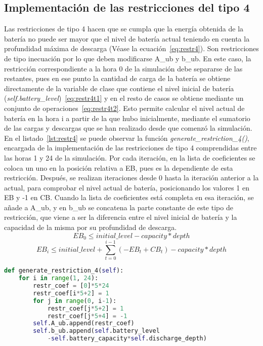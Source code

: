 \subsection{Implementación de las restricciones del tipo 4}
Las restricciones de tipo 4 hacen que se cumpla que la energía obtenida de la batería no puede ser mayor que el nivel de batería actual teniendo en cuenta la profundidad máxima de descarga (Véase la ecuación~\ref{eq:restr4}). Son restricciones de tipo inecuación por lo que deben modificarse A\_ub y b\_ub. En este caso, la restricción correspondiente a la hora 0 de la simulación debe separarse de las restantes, pues en ese punto la cantidad de carga de la batería se obtiene directamente de la variable de clase que contiene el nivel inicial de batería (\textit{self.battery\_level})~\ref{eq:restr4t1} y en el resto de casos se obtiene mediante un conjunto de operaciones~\ref{eq:restr4t2}. Esto permite calcular el nivel actual de batería en la hora i a partir de la que hubo inicialmente, mediante el sumatorio de las cargas y descargas que se han realizado desde que comenzó la simulación. En el listado~\ref{lst:restr4} se puede observar la función \textit{generate\_restriction\_4()}, encargada de la implementación de las restricciones de tipo 4 comprendidas entre las horas 1 y 24 de la simulación. Por cada iteración, en la lista de coeficientes se coloca un uno en la posición relativa a EB, pues es la dependiente de esta restricción. Después, se realizan iteraciones desde 0 hasta la iteración anterior a la actual, para comprobar el nivel actual de batería, posicionando los valores 1 en EB y -1 en CB. Cuando la lista de coeficientes está completa en esa iteración, se añade a A\_ub, y en b\_ub se concatena la parte constante de este tipo de restricción, que viene a ser la diferencia entre el nivel inicial de batería y la capacidad de la misma por su profundidad de descarga.
\begin{equation}
  \label{eq:restr4t1}
  EB_{0} \leq initial\_level - capacity * depth
\end{equation}
\begin{equation}
  \label{eq:restr4t2}
  EB_{i} \leq initial\_level + \sum_{t=0}^{i-1}(-EB_{t}+CB_{t}) - capacity * depth
\end{equation}
\begin{lstlisting}[language=Python,float=ht,caption={Restricciones del tipo 4},label={lst:restr4}]
def generate_restriction_4(self):
    for i in range(1, 24):
        restr_coef = [0]*5*24
        restr_coef[i*5+2] = 1
        for j in range(0, i-1):
            restr_coef[j*5+2] = 1
            restr_coef[j*5+4] = -1
        self.A_ub.append(restr_coef)
        self.b_ub.append(self.battery_level
            -self.battery_capacity*self.discharge_depth)
\end{lstlisting}
